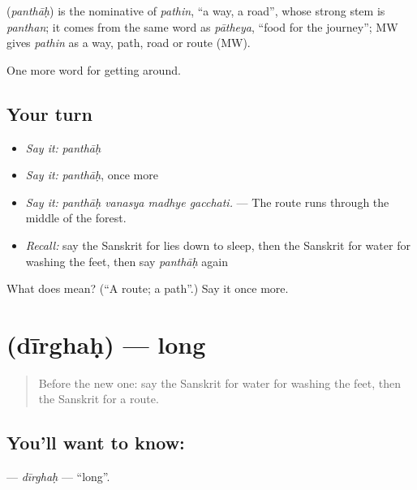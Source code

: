 \begin{cousinweb}
\textbf{} (\emph{panthāḥ}) is the nominative of \emph{pathin}, \textquotedblleft{}a way, a road\textquotedblright{}, whose strong stem is \emph{panthan}; it comes from the same word as \emph{pātheya}, \textquotedblleft{}food for the journey\textquotedblright{}; MW gives \emph{pathin} as a way, path, road or route (MW).
\end{cousinweb}

\begin{grammarlens}[title={What you've built}]
One more word for getting around.
\end{grammarlens}

\subsection*{Your turn}
\begin{itemize}
\raggedright
  \item \emph{Say it:} \emph{panthāḥ}
  \item \emph{Say it:} \emph{panthāḥ}, once more
  \item \emph{Say it:} \emph{panthāḥ vanasya madhye gacchati.} — The route runs through the middle of the forest.
  \item \emph{Recall:} say the Sanskrit for lies down to sleep, then the Sanskrit for water for washing the feet, then say \emph{panthāḥ} again
\end{itemize}

\begin{tcolorbox}[breakable,colback=teal!4,colframe=teal!35!black,title={Before you move on}]
What does  mean? (\textquotedblleft{}A route; a path\textquotedblright{}.) Say it once more.
\end{tcolorbox}
\section[\texorpdfstring{\sk{दीर्घः} (dīrghaḥ)}{दीर्घः (dīrghaḥ)}]{ (dīrghaḥ) — long}

\label{lesson:SA-C403-dirghah}



\begin{quote}
Before the new one: say the Sanskrit for water for washing the feet, then the Sanskrit for a route.
\end{quote}

\subsection*{You'll want to know: }
\textbf{} — \emph{dīrghaḥ} — \textquotedblleft{}long\textquotedblright{}.

